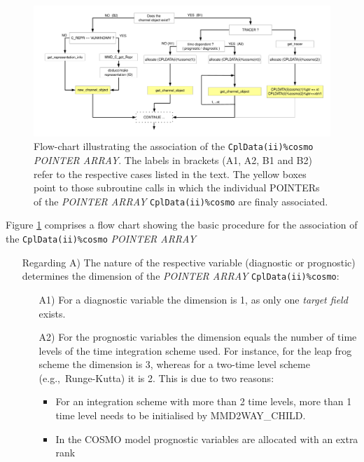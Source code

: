 \documentclass[11pt,twoside]{article}
\begin{document}
\begin{itemize}
\begin{enumerate}
\begin{figure}
\begin{center} 
\includegraphics[width=1.02\textwidth]{MMDUM_decisiontree.pdf} 
\end{center} 
\caption{Flow-chart illustrating the association of the {\tt CplData(ii)\%cosmo}
{\footnotesize \it POINTER ARRAY}. The labels in brackets (A1, A2, B1 and B2)
 refer to the respective cases listed in the text. The yellow boxes point to 
those subroutine calls in which the individual {\footnotesize POINTERs} of the
{\footnotesize \it POINTER ARRAY} {\tt CplData(ii)\%cosmo} are finaly associated.} 
\label{fig:A1A2B1B2} 
\end{figure} 
Figure \ref{fig:A1A2B1B2} comprises a flow chart showing the basic procedure
for the association of the \verb|CplData(ii)%cosmo| {\it \footnotesize POINTER
ARRAY}
\begin{itemize} %
 \item[Regarding A)] 
The nature of the respective variable (diagnostic or prognostic) determines
the dimension of the { \footnotesize \it POINTER ARRAY} \verb|CplData(ii)%cosmo|:
\begin{itemize} %
\item[A1)] For a diagnostic variable the dimension is 1, as only one 
{\it target field} exists. 
\item[A2)] For the prognostic variables the dimension equals 
the number of time levels of the time integration
scheme used. For instance, for the leap frog scheme the dimension is 3,
 whereas for a two-time level scheme (e.g.,\ Runge-Kutta) it is 2.
 This is due to two reasons:
\begin{itemize}%
\item For an integration scheme with more than 2 time levels, more than 1 time 
level needs to be initialised by MMD2WAY\_CHILD.
\item In the COSMO model prognostic variables are allocated with an extra rank

\end{itemize}
\end{itemize}
\end{itemize}
\end{enumerate}
\end{itemize}
\end{document}
